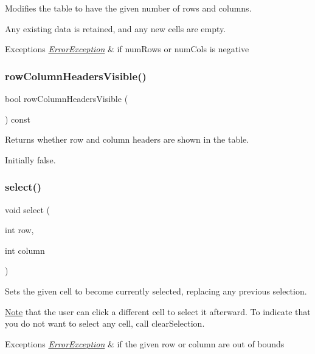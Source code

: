 Modifies the table to have the given number of rows and columns. 

Any existing data is retained, and any new cells are empty. 
\begin{DoxyExceptions}{Exceptions}
{\em \mbox{\hyperlink{classErrorException}{Error\+Exception}}} & if num\+Rows or num\+Cols is negative \\
\hline
\end{DoxyExceptions}
\mbox{\label{classGTable_a92c3dff0296ec16823a1172a9f9f07e6}} 
\subsubsection{\texorpdfstring{row\+Column\+Headers\+Visible()}{rowColumnHeadersVisible()}}
{\footnotesize\ttfamily bool row\+Column\+Headers\+Visible (\begin{DoxyParamCaption}{ }\end{DoxyParamCaption}) const\hspace{0.3cm}{\ttfamily [virtual]}}



Returns whether row and column headers are shown in the table. 

Initially false. \mbox{\label{classGTable_ab06a36d6ed149c8477a1a9d32be2ba43}} 
\subsubsection{\texorpdfstring{select()}{select()}}
{\footnotesize\ttfamily void select (\begin{DoxyParamCaption}\item[{int}]{row,  }\item[{int}]{column }\end{DoxyParamCaption})\hspace{0.3cm}{\ttfamily [virtual]}}



Sets the given cell to become currently selected, replacing any previous selection. 

\mbox{\hyperlink{classNote}{Note}} that the user can click a different cell to select it afterward. To indicate that you do not want to select any cell, call clear\+Selection. 
\begin{DoxyExceptions}{Exceptions}
{\em \mbox{\hyperlink{classErrorException}{Error\+Exception}}} & if the given row or column are out of bounds \\
\hline
\end{DoxyExceptions}
\mbox{\label{classGTable_ad1a09eece3a11ef4d2c56a951ae06a69}} 
